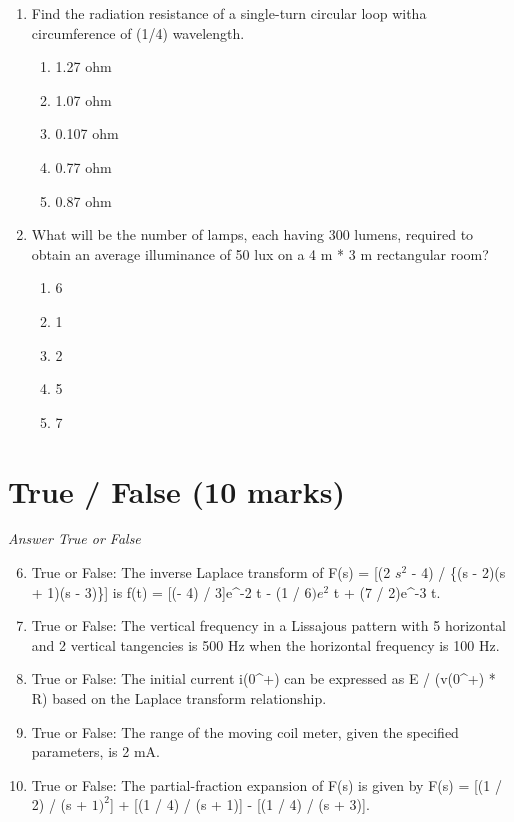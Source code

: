 \documentclass[12pt]{article}
\begin{document}
\begin{enumerate}[label=\arabic*.]
\begin{enumerate}[label=(\alph*)]
    \item 2\ensuremath{\delta}(t) + (3 e^-t + 2 e^-3 t)u(t)
    \item 3\ensuremath{\delta}(t) + (3 e^-t + 2 e^-3 t)u(t)
    \item 2 + (3 e^-t + 2 e^-3 t)u(t)
    \item 2 + (5 e^-t + 2 e^-3 t)
\end{enumerate}
\item Find the radiation resistance of a single-turn circular loop witha circumference of (1/4) wavelength.
\begin{enumerate}[label=(\alph*)]
    \item 1.27 ohm
    \item 1.07 ohm
    \item 0.107 ohm
    \item 0.77 ohm
    \item 0.87 ohm
\end{enumerate}
\item What will be the number of lamps, each having 300 lumens, required to obtain an average illuminance of 50 lux on a 4 m * 3 m rectangular room?
\begin{enumerate}[label=(\alph*)]
    \item 6
    \item 1
    \item 2
    \item 5
    \item 7
\end{enumerate}
\end{enumerate}

\section*{True / False (10 marks)}
\textit{Answer True or False}
\begin{enumerate}[label=\arabic*.]
\setcounter{enumi}{5}
\item True or False: The inverse Laplace transform of F(s) = [(2 $s^2$ - 4) / \{(s - 2)(s + 1)(s - 3)\}] is f(t) = [(- 4) / 3]e^-2 t - (1 / $6)e^2$ t + (7 / 2)e^-3 t.
\item True or False: The vertical frequency in a Lissajous pattern with 5 horizontal and 2 vertical tangencies is 500 Hz when the horizontal frequency is 100 Hz.
\item True or False: The initial current i(0^+) can be expressed as E / (v(0^+) * R) based on the Laplace transform relationship.
\item True or False: The range of the moving coil meter, given the specified parameters, is 2 mA.
\item True or False: The partial-fraction expansion of F(s) is given by F(s) = [(1 / 2) / (s + $1)^2$] + [(1 / 4) / (s + 1)] - [(1 / 4) / (s + 3)].
\end{enumerate}
\end{document}
